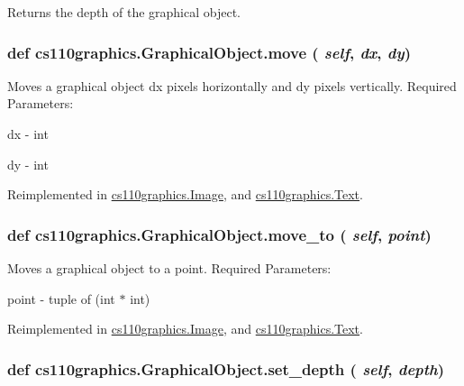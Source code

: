 Returns the depth of the graphical object. \hypertarget{classcs110graphics_1_1GraphicalObject_aa64d270fb83efa4a54e1a7953512f9cd}{
\subsubsection[{move}]{\setlength{\rightskip}{0pt plus 5cm}def cs110graphics.GraphicalObject.move ( {\em self}, \/   {\em dx}, \/   {\em dy})}}
\label{classcs110graphics_1_1GraphicalObject_aa64d270fb83efa4a54e1a7953512f9cd}


Moves a graphical object dx pixels horizontally and dy pixels vertically. Required Parameters:
\begin{DoxyItemize}
\item dx -\/ int
\item dy -\/ int 
\end{DoxyItemize}

Reimplemented in \hyperlink{classcs110graphics_1_1Image_a540d48247976343a91c610009a9af8cd}{cs110graphics.Image}, and \hyperlink{classcs110graphics_1_1Text_a6bd6f174fc82f2225a4d162ca6b90ec2}{cs110graphics.Text}.\hypertarget{classcs110graphics_1_1GraphicalObject_abe2d480265df7ac9447205c52c6946df}{
\subsubsection[{move\_\-to}]{\setlength{\rightskip}{0pt plus 5cm}def cs110graphics.GraphicalObject.move\_\-to ( {\em self}, \/   {\em point})}}
\label{classcs110graphics_1_1GraphicalObject_abe2d480265df7ac9447205c52c6946df}


Moves a graphical object to a point. Required Parameters:
\begin{DoxyItemize}
\item point -\/ tuple of (int $\ast$ int) 
\end{DoxyItemize}

Reimplemented in \hyperlink{classcs110graphics_1_1Image_a4b2e775fbb0cb523f6bc09028dc05c65}{cs110graphics.Image}, and \hyperlink{classcs110graphics_1_1Text_a615a76c8d2edd6c6af5d39d4e2577a27}{cs110graphics.Text}.\hypertarget{classcs110graphics_1_1GraphicalObject_a20d76d4ee4419c3065d61deb6cbc6700}{
\subsubsection[{set\_\-depth}]{\setlength{\rightskip}{0pt plus 5cm}def cs110graphics.GraphicalObject.set\_\-depth ( {\em self}, \/   {\em depth})}}
\label{classcs110graphics_1_1GraphicalObject_a20d76d4ee4419c3065d61deb6cbc6700}


